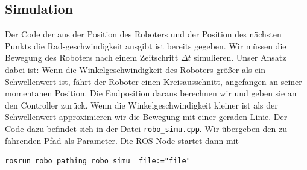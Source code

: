 \documentclass[11pt,a4paper]{article}
\begin{document}
\subsection*{Simulation}
Der Code der aus der Position des Roboters und der Position des nächsten Punkts die Rad-geschwindigkeit ausgibt
ist bereits gegeben. Wir müssen die Bewegung des Roboters nach einem Zeitschritt $\Delta t$ simulieren.
Unser Ansatz dabei ist: Wenn die Winkelgeschwindigkeit des Roboters größer als ein Schwellenwert ist, fährt der Roboter einen 
Kreisausschnitt, angefangen an seiner momentanen Position. Die Endposition daraus berechnen wir und
geben sie an den Controller zurück. Wenn die Winkelgeschwindigkeit kleiner ist als der Schwellenwert
approximieren wir die Bewegung mit einer geraden Linie. Der Code dazu befindet sich in der Datei \verb|robo_simu.cpp|.
Wir übergeben den zu fahrenden Pfad als Parameter. Die ROS-Node startet dann mit \begin{verbatim}
rosrun robo_pathing robo_simu _file:="file"
\end{verbatim}
\newpage
\end{document}
